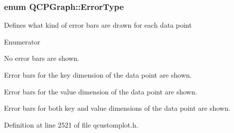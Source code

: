 \subsubsection[{Error\+Type}]{\setlength{\rightskip}{0pt plus 5cm}enum {\bf Q\+C\+P\+Graph\+::\+Error\+Type}}\label{class_q_c_p_graph_ad23b514404bd2cb3216f57c90904d6af}
Defines what kind of error bars are drawn for each data point \begin{Desc}
\item[Enumerator]\par
\begin{description}
\item[{\em 
\hypertarget{class_q_c_p_graph_ad23b514404bd2cb3216f57c90904d6afaeae745e7cc1766bb8546e35d4b76a711}{}et\+None\label{class_q_c_p_graph_ad23b514404bd2cb3216f57c90904d6afaeae745e7cc1766bb8546e35d4b76a711}
}]No error bars are shown. \item[{\em 
\hypertarget{class_q_c_p_graph_ad23b514404bd2cb3216f57c90904d6afa2a5d89cd76fb8b6b18d71b8f6f6c0f43}{}et\+Key\label{class_q_c_p_graph_ad23b514404bd2cb3216f57c90904d6afa2a5d89cd76fb8b6b18d71b8f6f6c0f43}
}]Error bars for the key dimension of the data point are shown. \item[{\em 
\hypertarget{class_q_c_p_graph_ad23b514404bd2cb3216f57c90904d6afa147022ccdc49f6bd48f904cb4f61872e}{}et\+Value\label{class_q_c_p_graph_ad23b514404bd2cb3216f57c90904d6afa147022ccdc49f6bd48f904cb4f61872e}
}]Error bars for the value dimension of the data point are shown. \item[{\em 
\hypertarget{class_q_c_p_graph_ad23b514404bd2cb3216f57c90904d6afa761cb7d61670c1e2efecccd8974409ab}{}et\+Both\label{class_q_c_p_graph_ad23b514404bd2cb3216f57c90904d6afa761cb7d61670c1e2efecccd8974409ab}
}]Error bars for both key and value dimensions of the data point are shown. \end{description}
\end{Desc}


Definition at line 2521 of file qcustomplot.\+h.


